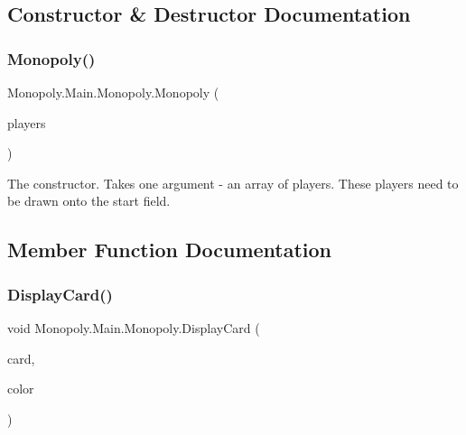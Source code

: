 \subsection{Constructor \& Destructor Documentation}
\mbox{\label{class_monopoly_1_1_main_1_1_monopoly_a3b9d422d35cc8474d3d494deb31ea843}} 
\subsubsection{\texorpdfstring{Monopoly()}{Monopoly()}}
{\footnotesize\ttfamily Monopoly.\+Main.\+Monopoly.\+Monopoly (\begin{DoxyParamCaption}\item[{\mbox{\hyperlink{class_monopoly_1_1_players_1_1_player}{Player}} \mbox{[}$\,$\mbox{]}}]{players }\end{DoxyParamCaption})\hspace{0.3cm}{\ttfamily [inline]}}

The constructor. Takes one argument -\/ an array of players. These players need to be drawn onto the start field. 

\subsection{Member Function Documentation}
\mbox{\label{class_monopoly_1_1_main_1_1_monopoly_af32328d31409f20d07c0debb9beb99ce}} 
\subsubsection{\texorpdfstring{Display\+Card()}{DisplayCard()}\hspace{0.1cm}{\footnotesize\ttfamily [1/3]}}
{\footnotesize\ttfamily void Monopoly.\+Main.\+Monopoly.\+Display\+Card (\begin{DoxyParamCaption}\item[{\mbox{\hyperlink{class_monopoly_1_1_main_1_1_property_card}{Property\+Card}}}]{card,  }\item[{Color}]{color }\end{DoxyParamCaption})\hspace{0.3cm}{\ttfamily [inline]}}

